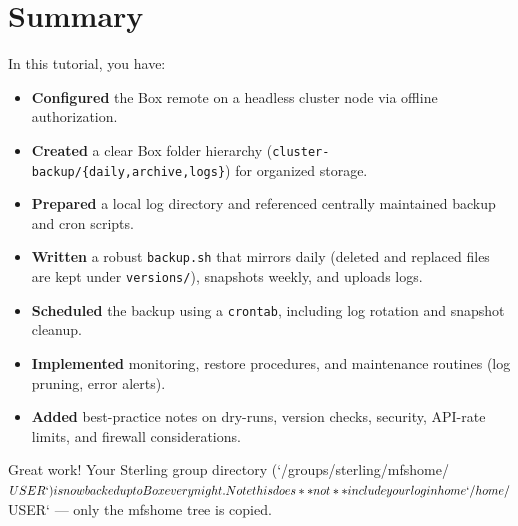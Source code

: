 \documentclass[12pt,letterpaper]{article}
\begin{document}
\section{Summary}
In this tutorial, you have:
\begin{itemize}
  \item \textbf{Configured} the Box remote on a headless cluster node via offline authorization.
  \item \textbf{Created} a clear Box folder hierarchy (\texttt{cluster-backup/\{daily,archive,logs\}}) for organized storage.
  \item \textbf{Prepared} a local log directory and referenced centrally maintained backup and cron scripts.
  \item \textbf{Written} a robust \texttt{backup.sh} that mirrors daily (deleted and replaced files are kept under \texttt{versions/}), snapshots weekly, and uploads logs.
  \item \textbf{Scheduled} the backup using a \texttt{crontab}, including log rotation and snapshot cleanup.
  \item \textbf{Implemented} monitoring, restore procedures, and maintenance routines (log pruning, error alerts).
  \item \textbf{Added} best-practice notes on dry-runs, version checks, security, API-rate limits, and firewall considerations.
\end{itemize}

Great work! Your Sterling group directory (`/groups/sterling/mfshome/$USER`) is now backed up to Box every night. Note this does **not** include your login home `/home/$USER` — only the mfshome tree is copied.
\end{document}
